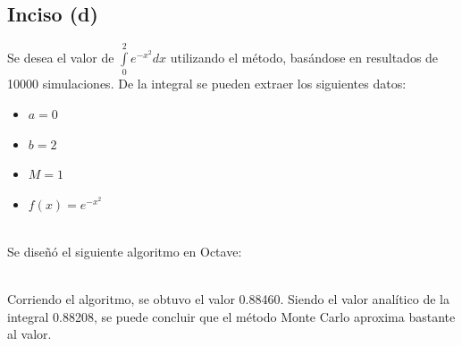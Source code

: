\documentclass[a4paper]{article}
\begin{document}
\subsection{Inciso (d)}
Se desea el valor de $\int\limits_0^2 e^{-x^2} dx$ utilizando el método,
basándose en resultados de 10000 simulaciones.
De la integral se pueden extraer los siguientes datos:

\begin{itemize}
\item $a = 0$
\item $b = 2$
\item $M = 1$
\item $f(x) = e^{-x^2}$
\end{itemize}
~\\

Se diseñó el siguiente algoritmo en Octave:


~\\

Corriendo el algoritmo, se obtuvo el valor 0.88460.
Siendo el valor analítico de la integral 0.88208, se puede concluir que el
método Monte Carlo aproxima bastante al valor.
\end{document}
